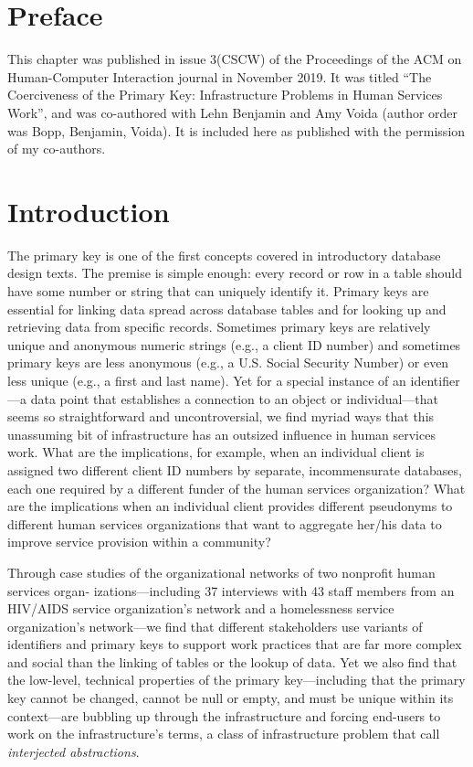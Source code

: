 \section{Preface}
This chapter was published in issue 3(CSCW) of the Proceedings of the ACM on Human-Computer Interaction journal in November 2019. It was titled ``The Coerciveness of the Primary Key: Infrastructure Problems in Human Services Work'', and was co-authored with Lehn Benjamin and Amy Voida (author order was Bopp, Benjamin, Voida). It is included here as published with the permission of my co-authors.

\section{Introduction}
The primary key is one of the first concepts covered in introductory database design texts. The premise is simple enough: every record or row in a table should have some number or string that can uniquely identify it. Primary keys are essential for linking data spread across database tables and for looking up and retrieving data from specific records. Sometimes primary keys are relatively unique and anonymous numeric strings (e.g., a client ID number) and sometimes primary keys are less anonymous (e.g., a U.S. Social Security Number) or even less unique (e.g., a first and last name). Yet for a special instance of an identifier---a data point that establishes a connection to an object or individual---that seems so straightforward and uncontroversial, we find myriad ways that this unassuming bit of infrastructure has an outsized influence in human services work. What are the implications, for example, when an individual client is assigned two different client ID numbers by separate, incommensurate databases, each one required by a different funder of the human services organization? What are the implications when an individual client provides different pseudonyms to different human services organizations that want to aggregate her/his data to improve service provision within a community?

Through case studies of the organizational networks of two nonprofit human services organ- izations---including 37 interviews with 43 staff members from an HIV/AIDS service organization's network and a homelessness service organization's network---we find that different stakeholders use variants of identifiers and primary keys to support work practices that are far more complex and social than the linking of tables or the lookup of data. Yet we also find that the low-level, technical properties of the primary key---including that the primary key cannot be changed, cannot be null or empty, and must be unique within its context---are bubbling up through the infrastructure and forcing end-users to work on the infrastructure's terms, a class of infrastructure problem that \citet{Edwards2010InfraProb} call \textit{interjected abstractions}.

